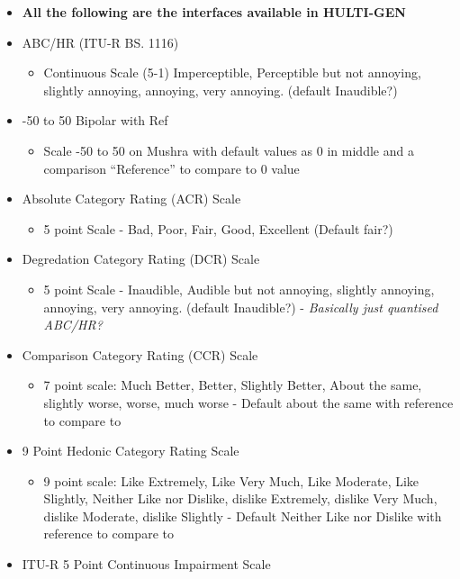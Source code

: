 \documentclass{sig-alternate}
\begin{document}
\begin{itemize}
		\item {\bf All the following are the interfaces available in HULTI-GEN~\cite{gribben2015toward} }
		\item ABC/HR (ITU-R BS. 1116)~\cite{recommendation19971116}
		\begin{itemize}
			\item Continuous Scale (5-1) Imperceptible, Perceptible but not annoying, slightly annoying, annoying, very annoying. (default Inaudible?)
		\end{itemize}
		\item -50 to 50 Bipolar with Ref
		\begin{itemize}
			\item Scale -50 to 50 on Mushra with default values as 0 in middle and a comparison ``Reference'' to compare to 0 value
		\end{itemize}
		\item Absolute Category Rating (ACR) Scale~\cite{rec1996p}
		\begin{itemize}
			\item 5 point Scale - Bad, Poor, Fair, Good, Excellent (Default fair?)
		\end{itemize}
		\item Degredation Category Rating (DCR) Scale~\cite{rec1996p}
		\begin{itemize}
			\item 5 point Scale - Inaudible, Audible but not annoying, slightly annoying, annoying, very annoying. (default Inaudible?) - {\it Basically just quantised ABC/HR?}
		\end{itemize}
		\item Comparison Category Rating (CCR) Scale~\cite{rec1996p}
		\begin{itemize}
			\item 7 point scale: Much Better, Better, Slightly Better, About the same, slightly worse, worse, much worse - Default about the same with reference to compare to
		\end{itemize}
		\item 9 Point Hedonic Category Rating Scale~\cite{peryam1952advanced}
		\begin{itemize}
			\item 9 point scale: Like Extremely, Like Very Much, Like Moderate, Like Slightly, Neither Like nor Dislike, dislike Extremely, dislike Very Much, dislike Moderate, dislike Slightly  - Default Neither Like nor Dislike with reference to compare to
		\end{itemize}
		\item ITU-R 5 Point Continuous Impairment Scale~\cite{rec1997bs}

\end{itemize}
\end{document}
